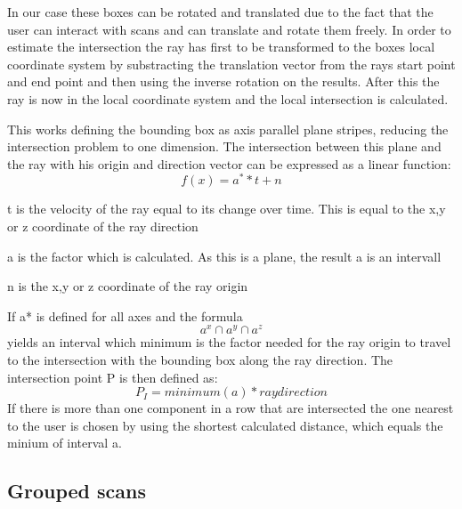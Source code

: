 \documentclass[hyperref,english,bachelorofscience,bibnum]{cgvpub}
\begin{document}
In our case these boxes can be rotated and translated due to the fact that the user can interact with scans and can translate and rotate them freely. In order to estimate the intersection the ray has first to be transformed to the boxes local coordinate system by substracting the translation vector from the rays start point and end point and then using the inverse rotation on the results.
After this the ray is now in the local coordinate system and the local intersection is calculated.

This works defining the bounding box as axis parallel plane stripes, reducing the intersection problem to one dimension. The intersection between this plane and the ray with his origin and direction vector can be expressed as a linear function:
\[
 f(x) = a^* * t + n
\]

t is the velocity of the ray equal to its change over time. This is equal to the x,y or z coordinate of the ray direction

a is the factor which is calculated. As this is a plane, the result a is an intervall

n is the x,y or z coordinate of the ray origin

If a* is defined for all axes and the formula 
\[
a^x \cap a^y \cap a^z
\]
yields an interval which minimum is the factor needed for the ray origin to travel to the intersection with the bounding box along the ray direction.
The intersection point P is then defined as:
\[
P_I = minimum(a) * raydirection
\]
If there is more than one component in a row that are intersected the one nearest to the user is chosen by using the shortest calculated distance, which equals the minium of interval a.

\subsection{Grouped scans}
\end{document}
